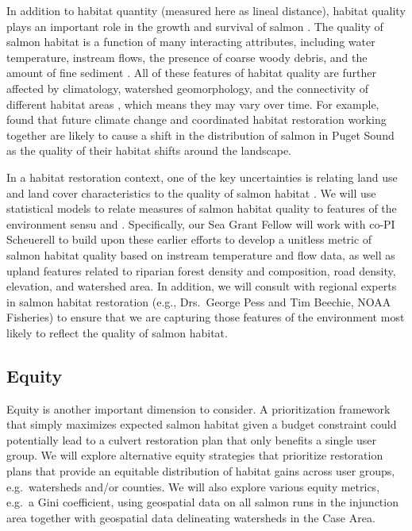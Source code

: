 \documentclass[12pt]{elsarticle}
\begin{document}
In addition to habitat quantity (measured here as lineal distance), habitat quality plays an important role in the growth and survival of salmon \citep{Pess_2011}. The quality of salmon habitat is a function of many interacting attributes, including water temperature, instream flows, the presence of coarse woody debris, and the amount of fine sediment \citep{Bartz_2006,Isaak_2007}. All of these features of habitat quality are further affected by climatology, watershed geomorphology, and the connectivity of different habitat areas \citep{Caissie_2006, Rodeles_2019}, which means they may vary over time. For example, \citet{Battin_2007} found that future climate change and coordinated habitat restoration working together are likely to cause a shift in the distribution of salmon in Puget Sound as the quality of their habitat shifts around the landscape.

In a habitat restoration context, one of the key uncertainties is relating land use and land cover characteristics to the quality of salmon habitat \citep{Bartz_2006, Jorgensen_2009}. We will use statistical models to relate measures of salmon habitat quality to features of the environment sensu \citet{Bartz_2006} and \citet{Jorgensen_2009}. Specifically, our Sea Grant Fellow will work with co-PI Scheuerell to build upon these earlier efforts to develop a unitless metric of salmon habitat quality based on instream temperature and flow data, as well as upland features related to riparian forest density and composition, road density, elevation, and watershed area. In addition, we will consult with regional experts in salmon habitat restoration (e.g., Drs.\ George Pess and Tim Beechie, NOAA Fisheries) to ensure that we are capturing those features of the environment most likely to reflect the quality of salmon habitat.

\subsection*{Equity}

Equity is another important dimension to consider. A prioritization framework that simply maximizes expected salmon habitat given a budget constraint could potentially lead to a culvert restoration plan that only benefits a single user group. We will explore alternative equity strategies that prioritize restoration plans that provide an equitable distribution of habitat gains across user groups, e.g.\ watersheds and/or counties. We will also explore various equity metrics, e.g.\ a Gini coefficient, using geospatial data on all salmon runs in the injunction area together with geospatial data delineating watersheds in the Case Area. 
\end{document}
